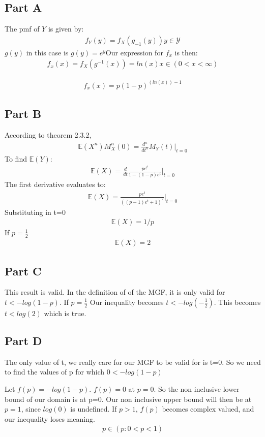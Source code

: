 \documentclass{article}
\begin{document}
\subsection*{Part A}
The pmf of $Y$ is given by:
\begin{align*}
f_Y(y) = f_X(g_{-1}(y)) y\in \mathcal{Y}
\end{align*}
$g(y)$ in this case is $g(y)=e^y$Our expression for $f_x$ is then:
\begin{align*}
f_x(x) = f_X(g^{-1}(x)) = ln(x) x\in (0<x<\infty)
\end{align*}

\begin{align*}
\boxed{ f_x(x) = p(1-p)^{(ln(x))-1} }
\end{align*}
\subsection*{Part B}
According to theorem 2.3.2,
\begin{align*}
\mathbb{E}(X^n)M_X^{n}(0) = \frac{d^n}{dt^n}M_Y(t)|_{t=0}
\end{align*}
To find $\mathbb{E}(Y)$:
\begin{align*}
\mathbb{E}(X) = \frac{d}{dt}\frac{pe^t}{1-(1-p)e^t}|_{t=0}
\end{align*}
The first derivative evaluates to:
\begin{align*}
\mathbb{E}(X) = \frac{p e^t}{((p-1)e^t+1)^2}|_{t=0}
\end{align*}
Substituting in t=0
\begin{align*}
\mathbb{E}(X) = 1/p
\end{align*}
If $p=\frac{1}{2}$
\begin{align*}
\boxed{\mathbb{E}(X) = 2}
\end{align*}
\subsection*{Part C}
This result is valid. In the definition of of the MGF, it is only valid for $t < -log(1-p)$. If $p=\frac{1}{2}$
Our inequality becomes $t<-log(-\frac{1}{2})$. This becomes $t<log(2)$ which is true.
\subsection*{Part D}
The only value of t, we really care for our MGF to be valid for is t=0. So we need to find the values of p for which $0<-log(1-p)$

Let $f(p)=-log(1-p)$. $f(p)=0$ at $p=0$. So the non inclusive lower bound of our domain is at p=0. Our non inclusive upper bound will then be at $p=1$, since $log(0)$ is undefined. If $p>1$, $f(p)$ becomes complex valued, and our inequality loses meaning.
\begin{align*}
\boxed{p \in (p: 0<p<1)}
\end{align*}
\end{document}
